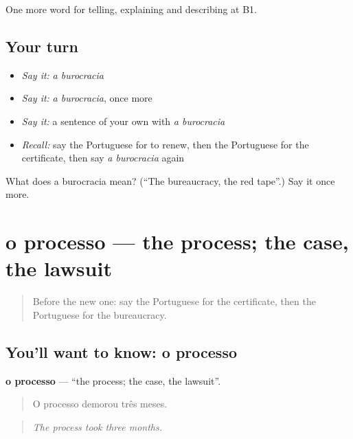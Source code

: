 \begin{grammarlens}[title={What you've built}]
One more word for telling, explaining and describing at B1.
\end{grammarlens}

\subsection*{Your turn}
\begin{itemize}
\raggedright
  \item \emph{Say it:} \emph{a burocracia}
  \item \emph{Say it:} \emph{a burocracia}, once more
  \item \emph{Say it:} a sentence of your own with \emph{a burocracia}
  \item \emph{Recall:} say the Portuguese for to renew, then the Portuguese for the certificate, then say \emph{a burocracia} again
\end{itemize}

\begin{tcolorbox}[breakable,colback=teal!4,colframe=teal!35!black,title={Before you move on}]
What does a burocracia mean? (\textquotedblleft{}The bureaucracy, the red tape\textquotedblright{}.) Say it once more.
\end{tcolorbox}
\section[o processo]{o processo — the process; the case, the lawsuit}

\label{lesson:PT-C385-processo}



\begin{quote}
Before the new one: say the Portuguese for the certificate, then the Portuguese for the bureaucracy.
\end{quote}

\subsection*{You'll want to know: o processo}
\textbf{o processo} — \textquotedblleft{}the process; the case, the lawsuit\textquotedblright{}.

\begin{quote}
O processo demorou três meses.
\end{quote}

\begin{quote}
\emph{The process took three months.}
\end{quote}

